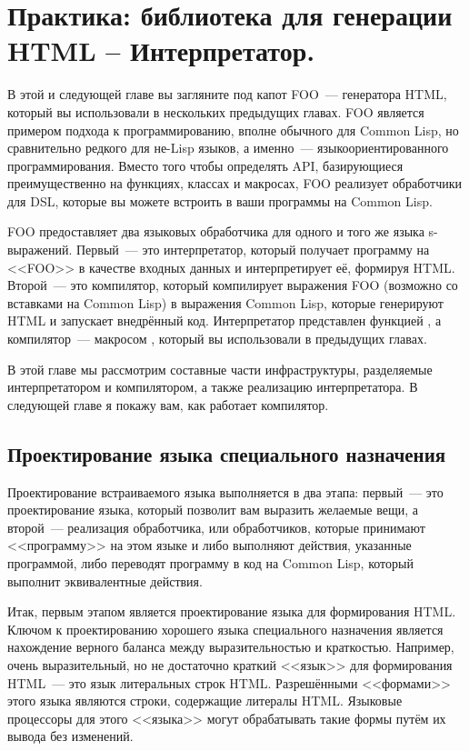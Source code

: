 \chapter{Практика: библиотека для генерации HTML -- Интерпретатор.}
\label{ch:30}

В этой и следующей главе вы загляните под капот FOO~--- генератора HTML, который вы
использовали в нескольких предыдущих главах. FOO является примером подхода к
программированию, вполне обычного для Common Lisp, но сравнительно редкого для не-Lisp
языков, а именно~--- языкоориентированного программирования. Вместо того чтобы определять
API, базирующиеся преимущественно на функциях, классах и макросах, FOO реализует
обработчики для DSL,
которые вы можете встроить в ваши программы на Common Lisp.

FOO предоставляет два языковых обработчика для одного и того же языка
s-выражений. Первый~--- это интерпретатор, который получает программу на <<FOO>> в качестве
входных данных и интерпретирует её, формируя HTML. Второй~--- это компилятор, который
компилирует выражения FOO (возможно со вставками на Common Lisp) в выражения Common Lisp,
которые генерируют HTML и запускает внедрённый код. Интерпретатор представлен функцией
, а компилятор~--- макросом , который вы использовали в
предыдущих главах.

В этой главе мы рассмотрим составные части инфраструктуры, разделяемые интерпретатором и
компилятором, а также реализацию интерпретатора. В следующей главе я покажу вам, как
работает компилятор.

\section{Проектирование языка специального назначения}

Проектирование встраиваемого языка выполняется в два этапа: первый~--- это проектирование
языка, который позволит вам выразить желаемые вещи, а второй~--- реализация обработчика,
или обработчиков, которые принимают <<программу>> на этом языке и либо выполняют действия,
указанные программой, либо переводят программу в код на Common Lisp, который выполнит
эквивалентные действия.

Итак, первым этапом является проектирование языка для формирования HTML. Ключом к
проектированию хорошего языка специального назначения является нахождение верного баланса
между выразительностью и краткостью. Например, очень выразительный, но не достаточно
краткий <<язык>> для формирования HTML~--- это язык литеральных строк HTML. Разрешёнными
<<формами>> этого языка являются строки, содержащие литералы HTML.  Языковые процессоры
для этого <<языка>> могут обрабатывать такие формы путём их вывода без изменений.

